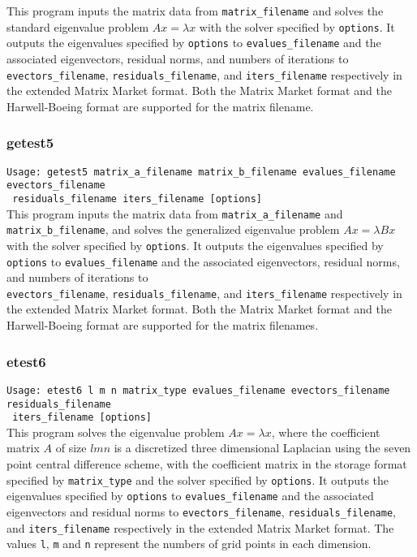 \documentclass[a4paper]{article}
\begin{document}
This program inputs the matrix data from {\tt matrix\_filename} and
solves the standard eigenvalue problem $Ax=\lambda x$ with
the solver specified by {\tt options}. 
It outputs the eigenvalues specified by {\tt options} to 
{\tt evalues\_filename} and the associated 
eigenvectors, residual norms, and numbers of iterations  
to \\ {\tt evectors\_filename}, {\tt residuals\_filename}, 
and {\tt iters\_filename} respectively in the extended 
Matrix Market format.
Both the Matrix Market format and the Harwell-Boeing format are
supported for the matrix filename. 

\subsubsection{getest5}

\verb+Usage: getest5 matrix_a_filename matrix_b_filename evalues_filename evectors_filename +\\
\verb+ residuals_filename iters_filename [options] +\\

This program inputs the matrix data from {\tt matrix\_a\_filename} and
{\tt matrix\_b\_filename}, and solves the generalized eigenvalue problem
$Ax=\lambda Bx$ with the solver specified by {\tt options}. 
It outputs the eigenvalues specified by {\tt options} to 
{\tt evalues\_filename} and the associated 
eigenvectors, residual norms, and numbers of iterations  
to \\ {\tt evectors\_filename}, {\tt residuals\_filename}, 
and {\tt iters\_filename} respectively in the extended 
Matrix Market format.  
Both the Matrix Market format and the Harwell-Boeing format are
supported for the matrix filenames. 

\subsubsection{etest6}

\verb+Usage: etest6 l m n matrix_type evalues_filename evectors_filename residuals_filename +\\
\verb+ iters_filename [options] +\\

This program solves the eigenvalue problem $Ax = \lambda x$, where the 
coefficient matrix $A$ of size $lmn$ is a discretized three dimensional Laplacian using the seven
point central difference scheme, with the coefficient matrix in the storage format specified
by \verb|matrix_type| and the solver specified by {\tt options}. 
It outputs the eigenvalues specified by {\tt options} to 
{\tt evalues\_filename} and the associated 
eigenvectors and residual norms to {\tt evectors\_filename},  
{\tt residuals\_filename}, and {\tt iters\_filename} respectively 
in the extended Matrix Market format.
The values {\tt l}, {\tt m} and {\tt n} represent the numbers of grid
points in each dimension.
\end{document}

